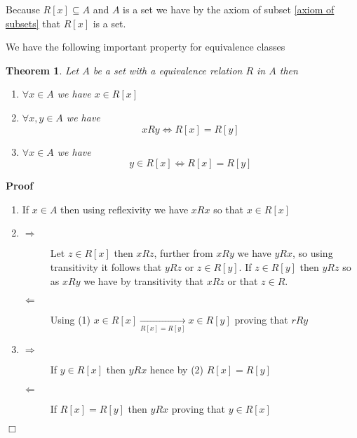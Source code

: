 \documentclass{book}
\newcommand{\Rightarrowlim}{\mathop{\rightarrow}\limits}
\newenvironment{proof}{\noindent\textbf{Proof\ }}{\hspace*{\fill}$\Box$\medskip}
\newtheorem{theorem}{Theorem}
\begin{document}
\begin{note}
  Because $R [x] \subseteq A$ and $A$ is a set we have by the axiom of subset
  \ref{axiom of subsets} that $R [x]$ is a set.
\end{note}

We have the following important property for equivalence classes

\begin{theorem}
  \label{equivalence relation R[x]=R[y]}Let $A$ be a set with a equivalence
  relation $R$ in $A$ then
  \begin{enumerate}
    \item $\forall x \in A$ we have $x \in R [x]$
    
    \item $\forall x, y \in A$ we have
    \[ x R y \Leftrightarrow R [x] = R [y] \]
    \item $\forall x \in A$ we have
    \[ y \in R [x] \Leftrightarrow R [x] = R [y] \]
  \end{enumerate}
\end{theorem}

\begin{proof}
  
  \begin{enumerate}
    \item If $x \in A$ then using reflexivity we have $x R x$ so that $x \in R
    [x]$
    
    \item 
    \begin{description}
      \item[$\Rightarrow$] Let $z \in R [x]$ then $x R z$, further from $x R
      y$ we have $y R x$, so using transitivity it follows that $y R z$ or $z
      \in R [y]$. If $z \in R [y]$ then $y R z$ so as $x R y$ we have by
      transitivity that $x R z$ or that $z \in R$.
      
      \item[$\Leftarrow$] Using (1) $x \in R [x] \Rightarrowlim_{R [x] = R
      [y]} x \in R [y]$ proving that $r R y$
    \end{description}
    \item 
    \begin{description}
      \item[$\Rightarrow$] If $y \in R [x]$ then $y R x$ hence by (2) $R [x] =
      R [y]$
      
      \item[$\Leftarrow$] If $R [x] = R [y]$ then $y R x$ proving that $y \in
      R [x]$
    \end{description}
  \end{enumerate}
\end{proof}
\end{document}
